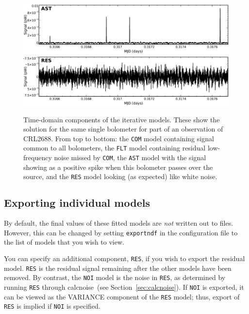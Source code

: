 \documentclass[twoside,11pt]{article}
\newcommand{\htmlref}[2]{#1}
\newcommand{\latexhtml}[2]{#1}
\newcommand{\xref}[3]{#1}
\newcommand{\xlabel}[1]{}
\renewcommand{\_}{\texttt{\symbol{95}}}
\newcommand{\task}[1]{\textsf{#1}}
\newcommand{\calcnoise}{\xref{\task{calcnoise}}{sun258}{CALCNOISE}}
\newcommand{\cref}[3]{\latexhtml{#1~\ref{#2}}{\htmlref{#3}{#2}}}
\begin{document}
\begin{figure}
\begin{center}
\begin{htmlonly}
  \includegraphics[width=136mm]{sc21_ast.eps} \\
  \includegraphics[width=136mm]{sc21_res.eps} \\
\end{htmlonly}
\caption{\small Time-domain components of the iterative models. These
show the solution for the same single bolometer for part of an
observation of CRL2688. From top to bottom: the \texttt{COM} model
containing signal common to all bolometers, the \texttt{FLT} model
containing residual low-frequency noise missed by \texttt{COM}, the
\texttt{AST} model with the signal showing as a positive spike when
this bolometer passes over the source, and the \texttt{RES} model
looking (as expected) like white noise.}
\label{fig:itercomp}
\end{center}
\end{figure}



\subsection{\xlabel{export}Exporting individual models}
\label{sec:export}

By default, the final values of these fitted models are {\em not}
written out to files. However, this can be changed by setting
\texttt{exportndf} in the configuration file to the list of models
that you wish to view.

You can specify an additional component, \texttt{RES}, if you wish to
export the residual model. \texttt{RES} is the residual signal
remaining after the other models have been removed. By contrast, the
\texttt{NOI} model is the noise in \texttt{RES}, as determined by
running \texttt{RES} through \calcnoise\ (see
\cref{Section}{sec:calcnoise}{Checking the array performance}). If
\texttt{NOI} is exported, it can be
viewed as the VARIANCE component of the \texttt{RES} model; thus,
export of \texttt{RES} is implied if \texttt{NOI} is specified.
\end{document}
